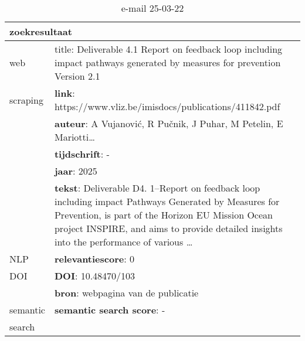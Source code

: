 \begin{table}[h!]
    \caption{e-mail 25-03-22}
    \centering
    \begin{tabularx}{\textwidth}{|p{4cm}|X|} 
        \hline
        \multicolumn{2}{|X|}{\textbf{zoekresultaat}} \\
        \hline
        web &title: Deliverable 4.1 Report on feedback loop including impact pathways generated by measures for prevention Version 2.1\\
        scraping&\textbf{link}: https://www.vliz.be/imisdocs/publications/411842.pdf\\
        &\textbf{auteur}: A Vujanović, R Pučnik, J Puhar, M Petelin, E Mariotti…\\
        &\textbf{tijdschrift}: -\\
        &\textbf{jaar}: 2025\\
        &\textbf{tekst}: Deliverable D4. 1–Report on feedback loop including impact Pathways Generated by Measures for Prevention, is part of the Horizon EU Mission Ocean project INSPIRE, and aims to provide detailed insights into the performance of various …\\
        \hline
        NLP&\textbf{relevantiescore}: 0\\
        \hline
        DOI&\textbf{DOI}: 10.48470/103\\
        &\textbf{bron}: webpagina van de publicatie\\
        \hline
        semantic&\textbf{semantic search score}: -\\
        search&\\
        \hline
    \end{tabularx}
    \label{table:email20250322}
\end{table}
